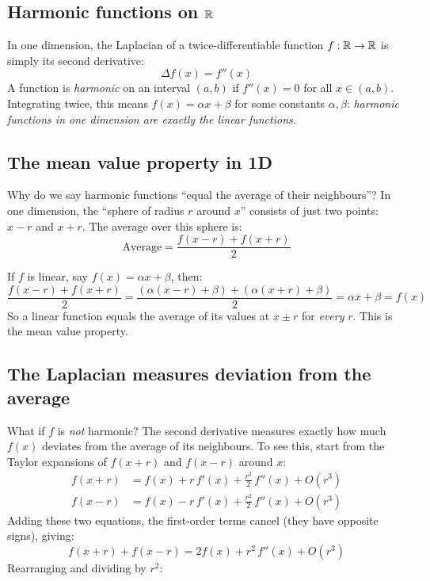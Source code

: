 \begin{notechapter}
\subsection{Harmonic functions on \texorpdfstring{$\mathbb{R}$}{R}}

In one dimension, the Laplacian of a twice-differentiable function
$f : \mathbb{R} \to \mathbb{R}$ is simply its second derivative:
\begin{equation}
\Delta f(x) = f''(x)
\end{equation}
A function is \emph{harmonic} on an interval $(a,b)$ if $f''(x) = 0$ for
all $x \in (a,b)$. Integrating twice, this means $f(x) = \alpha x + \beta$
for some constants $\alpha, \beta$: \emph{harmonic functions in one dimension
are exactly the linear functions.}

\subsection{The mean value property in 1D}

Why do we say harmonic functions ``equal the average of their neighbours''?
In one dimension, the ``sphere of radius $r$ around $x$'' consists of just
two points: $x - r$ and $x + r$. The average over this sphere is:
\begin{equation}
\text{Average} = \frac{f(x-r) + f(x+r)}{2}
\end{equation}

If $f$ is linear, say $f(x) = \alpha x + \beta$, then:
\[
\frac{f(x-r) + f(x+r)}{2}
= \frac{(\alpha(x-r) + \beta) + (\alpha(x+r) + \beta)}{2}
= \alpha x + \beta = f(x)
\]
So a linear function equals the average of its values at $x \pm r$ for
\emph{every} $r$. This is the mean value property.

\subsection{The Laplacian measures deviation from the average}

What if $f$ is \emph{not} harmonic? The second derivative measures exactly
how much $f(x)$ deviates from the average of its neighbours. To see this,
start from the Taylor expansions of $f(x+r)$ and $f(x-r)$ around $x$:
\begin{align}
f(x+r) &= f(x) + r\,f'(x) + \frac{r^2}{2}\,f''(x) + O(r^3) \\
f(x-r) &= f(x) - r\,f'(x) + \frac{r^2}{2}\,f''(x) + O(r^3)
\end{align}
Adding these two equations, the first-order terms cancel (they have opposite
signs), giving:
\begin{equation}
f(x+r) + f(x-r) = 2f(x) + r^2\,f''(x) + O(r^3)
\end{equation}
Rearranging and dividing by $r^2$:


\end{notechapter}
